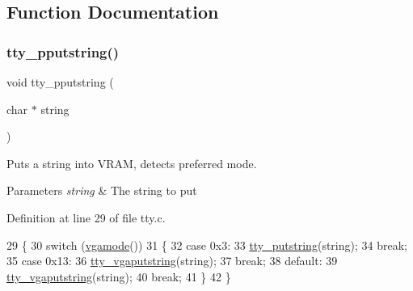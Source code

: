 \subsection{Function Documentation}
\mbox{\label{a00080_ade960b1320324706aac6c00cc6b1b2fe_ade960b1320324706aac6c00cc6b1b2fe}} 
\subsubsection{\texorpdfstring{tty\+\_\+pputstring()}{tty\_pputstring()}}
{\footnotesize\ttfamily void tty\+\_\+pputstring (\begin{DoxyParamCaption}\item[{char $\ast$}]{string }\end{DoxyParamCaption})}



Puts a string into V\+R\+AM, detects preferred mode. 


\begin{DoxyParams}{Parameters}
{\em string} & The string to put \\
\hline
\end{DoxyParams}


Definition at line 29 of file tty.\+c.


\begin{DoxyCode}
29                                   \{
30     \textcolor{keywordflow}{switch} (\hyperlink{a00008_af6d170c9401ea8f94d4c5cf09347cca7_af6d170c9401ea8f94d4c5cf09347cca7}{vgamode}())
31     \{
32     \textcolor{keywordflow}{case} 0x3:
33         \hyperlink{a00080_a2ebb962f457a2677d70285d1c0f9be12_a2ebb962f457a2677d70285d1c0f9be12}{tty\_putstring}(\textcolor{keywordtype}{string});
34         \textcolor{keywordflow}{break};
35     \textcolor{keywordflow}{case} 0x13:
36         \hyperlink{a00080_a13ff2c06d56753c5666ca56cb2d81100_a13ff2c06d56753c5666ca56cb2d81100}{tty\_vgaputstring}(\textcolor{keywordtype}{string});
37         \textcolor{keywordflow}{break};
38     \textcolor{keywordflow}{default}:
39         \hyperlink{a00080_a13ff2c06d56753c5666ca56cb2d81100_a13ff2c06d56753c5666ca56cb2d81100}{tty\_vgaputstring}(\textcolor{keywordtype}{string});
40         \textcolor{keywordflow}{break};
41     \}
42 \}
\end{DoxyCode}
\mbox{\label{a00080_a2ebb962f457a2677d70285d1c0f9be12_a2ebb962f457a2677d70285d1c0f9be12}} 

